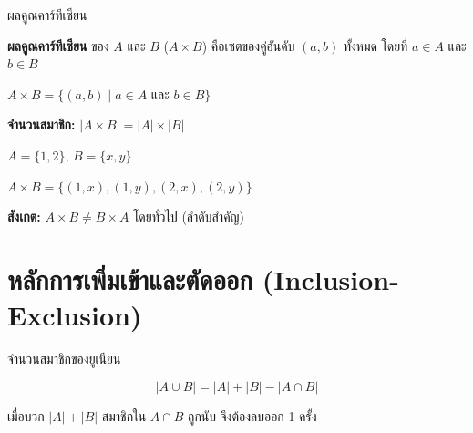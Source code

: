 \documentclass[11pt, aspectratio=169]{beamer}
\begin{document}
\begin{frame}{ผลคูณคาร์ทีเซียน}
  \begin{explanation}[นิยาม]
    \textbf{ผลคูณคาร์ทีเซียน} ของ $A$ และ $B$ ($A \times B$) คือเซตของคู่อันดับ $(a, b)$ ทั้งหมด
    โดยที่ $a \in A$ และ $b \in B$

    \medskip
    $A \times B = \{(a, b) \mid a \in A \text{ และ } b \in B\}$

    \medskip
    \textbf{จำนวนสมาชิก:} $|A \times B| = |A| \times |B|$
  \end{explanation}

  \begin{exambox}[ตัวอย่าง]
    $A = \{1, 2\}$, \quad $B = \{x, y\}$

    \medskip
    $A \times B = \{(1, x), (1, y), (2, x), (2, y)\}$

    \medskip
    \textbf{สังเกต:} $A \times B \neq B \times A$ โดยทั่วไป (ลำดับสำคัญ)
  \end{exambox}
\end{frame}

\section{หลักการเพิ่มเข้าและตัดออก (Inclusion-Exclusion)}

\begin{frame}{จำนวนสมาชิกของยูเนียน}
  \begin{explanation}
    \[
      |A \cup B| = |A| + |B| - |A \cap B|
    \]
  \end{explanation}

  \begin{center}
  \end{center}

  \begin{intuition}[เหตุผล]
    เมื่อบวก $|A| + |B|$ สมาชิกใน $A \cap B$ ถูกนับ 
    จึงต้องลบออก 1 ครั้ง
  \end{intuition}
\end{frame}
\end{document}
